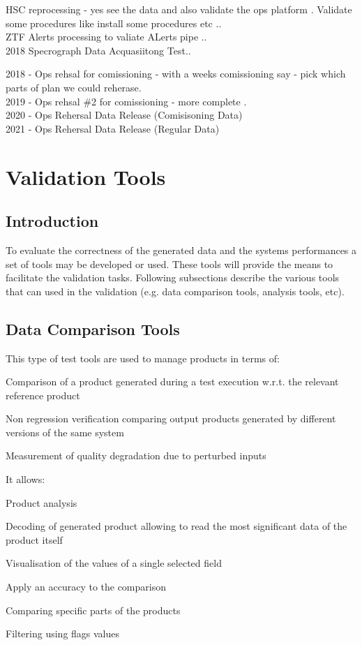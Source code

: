 HSC reprocessing - yes see the data and also validate the ops platform . Validate some procedures like install some procedures etc .. \\

ZTF Alerts processing to valiate ALerts pipe .. \\

2018 Specrograph Data Acquasiitong Test..

2018 - Ops rehsal for comissioning - with a weeks comissioning say - pick which parts of plan we could reherase.\\

2019 - Ops rehsal \#2 for comissioning - more complete .\\

2020 - Ops Rehersal Data Release (Comisisoning Data)\\
2021 - Ops Rehersal Data Release (Regular Data)\\


\section{Validation Tools}
\subsection{Introduction}

To evaluate the correctness of the generated data and the systems performances a set of tools may be developed or used. These
tools will provide the means to facilitate the validation tasks. 
Following subsections describe the various tools that can used in the \product validation (e.g. data comparison tools, analysis tools, etc).

\subsection{Data Comparison Tools}
This type of test tools are used to manage products in terms of:
\begin{itemize_single}
\item Comparison of a product generated during a test execution w.r.t. the relevant reference product
\item Non regression verification comparing output products generated by different versions of the same system
\item Measurement of quality degradation due to perturbed inputs
\end{itemize_single}
It allows:
\begin{itemize_single}
\item Product analysis
\item Decoding of generated product allowing to read the most significant data of the product itself
\item Visualisation of the values of a single selected field
\item Apply an accuracy to the comparison
\item Comparing specific parts of the products
\item Filtering using flags values
\end{itemize_single}

